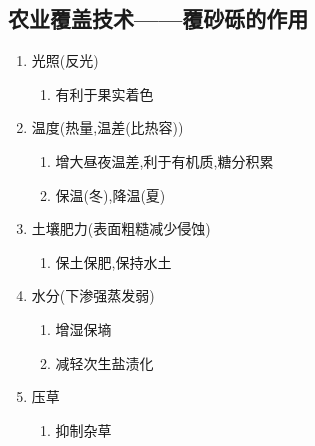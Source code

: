 \documentclass[a4paper]{article}
\begin{document}
    \subsection{农业覆盖技术——覆砂砾的作用}
    \begin{enumerate}
        \item 光照(反光)
        \begin{enumerate}
            \item 有利于果实着色
        \end{enumerate}
        \item 温度(热量,温差(比热容))
        \begin{enumerate}
            \item 增大昼夜温差,利于有机质,糖分积累
            \item 保温(冬),降温(夏)
        \end{enumerate}
        \item 土壤肥力(表面粗糙减少侵蚀)
        \begin{enumerate}
            \item 保土保肥,保持水土 %
        \end{enumerate}
        \item 水分(下渗强蒸发弱)
        \begin{enumerate}
            \item 增湿保墒
            \item 减轻次生盐渍化
        \end{enumerate}
        \item 压草
        \begin{enumerate}
            \item 抑制杂草
        \end{enumerate}
    \end{enumerate}
\end{document}
